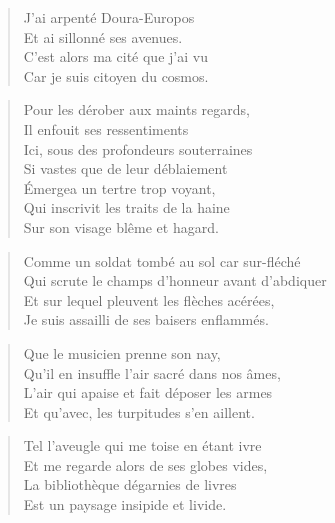 \begin{verse}
J’ai arpenté Doura-Europos\\
Et ai sillonné ses avenues.\\
C’est alors ma cité que j’ai vu\\
Car je suis citoyen du cosmos.
\end{verse}

\begin{verse}
Pour les dérober aux maints regards,\\
Il enfouit ses ressentiments\\
Ici, sous des profondeurs souterraines\\
Si vastes que de leur déblaiement\\
Émergea un tertre trop voyant,\\
Qui inscrivit les traits de la haine\\
Sur son visage blême et hagard.
\end{verse}



\begin{verse}
Comme un soldat tombé au sol car sur-fléché\\
Qui scrute le champs d’honneur avant d’abdiquer\\
Et sur lequel pleuvent les flèches acérées,\\
Je suis assailli de ses  baisers enflammés.
\end{verse}

\begin{verse}
Que le musicien prenne son nay,\\
Qu’il en insuffle l’air sacré dans nos âmes,\\
L’air qui apaise et fait déposer les armes\\
Et qu’avec, les turpitudes s’en aillent.
\end{verse}

\begin{verse}
Tel l’aveugle qui me toise en étant ivre\\
Et me regarde alors de ses globes vides,\\
La bibliothèque dégarnies de livres\\
Est un paysage insipide et livide.
\end{verse}

